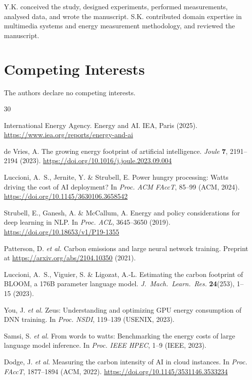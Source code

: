\documentclass[11pt]{article}
\begin{document}
Y.K. conceived the study, designed experiments, performed measurements, analysed data, and wrote the manuscript. S.K. contributed domain expertise in multimedia systems and energy measurement methodology, and reviewed the manuscript.

\section*{Competing Interests}

The authors declare no competing interests.

\begin{thebibliography}{30}

International Energy Agency.
Energy and AI.
IEA, Paris (2025).
\url{https://www.iea.org/reports/energy-and-ai}

de Vries, A.
The growing energy footprint of artificial intelligence.
\textit{Joule} \textbf{7}, 2191--2194 (2023).
\url{https://doi.org/10.1016/j.joule.2023.09.004}

Luccioni, A.~S., Jernite, Y. \& Strubell, E.
Power hungry processing: Watts driving the cost of AI deployment?
In \textit{Proc. ACM FAccT}, 85--99 (ACM, 2024).
\url{https://doi.org/10.1145/3630106.3658542}

Strubell, E., Ganesh, A. \& McCallum, A.
Energy and policy considerations for deep learning in NLP.
In \textit{Proc. ACL}, 3645--3650 (2019).
\url{https://doi.org/10.18653/v1/P19-1355}

Patterson, D. \textit{et al.}
Carbon emissions and large neural network training.
Preprint at \url{https://arxiv.org/abs/2104.10350} (2021).

Luccioni, A.~S., Viguier, S. \& Ligozat, A.-L.
Estimating the carbon footprint of BLOOM, a 176B parameter language model.
\textit{J.~Mach.~Learn.~Res.} \textbf{24}(253), 1--15 (2023).

You, J. \textit{et al.}
Zeus: Understanding and optimizing GPU energy consumption of DNN training.
In \textit{Proc. NSDI}, 119--139 (USENIX, 2023).

Samsi, S. \textit{et al.}
From words to watts: Benchmarking the energy costs of large language model inference.
In \textit{Proc. IEEE HPEC}, 1--9 (IEEE, 2023).

Dodge, J. \textit{et al.}
Measuring the carbon intensity of AI in cloud instances.
In \textit{Proc. FAccT}, 1877--1894 (ACM, 2022).
\url{https://doi.org/10.1145/3531146.3533234}


\end{thebibliography}
\end{document}
